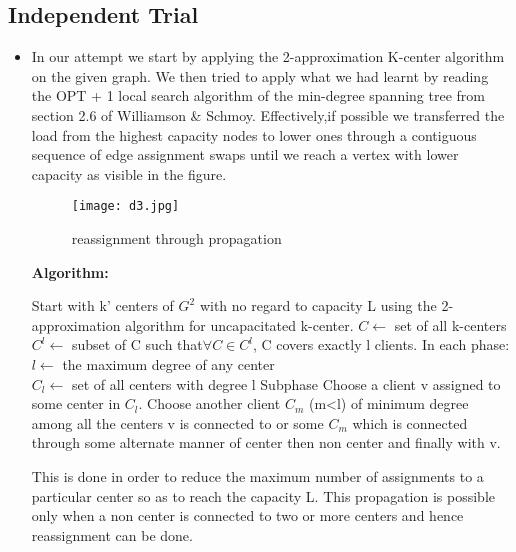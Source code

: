 \documentclass[12pt,a4paper,onecolumn]{article}
\begin{document}
\subsection{Independent Trial}
\begin{itemize}
\item In our attempt we start by applying the 2-approximation K-center algorithm on the given graph. We then tried to apply what we had learnt by reading the OPT + 1 local search algorithm of the min-degree spanning tree from section 2.6 of Williamson \& Schmoy. Effectively,if possible we transferred the load from the highest capacity nodes to lower ones through a contiguous sequence of edge assignment swaps until we reach a vertex with lower capacity as visible in the figure. \\
\begin{figure}[H]
\begin{center}
\texttt{[image: d3.jpg]}
  \caption{reassignment through propagation}
  \label{Figure 13}
\end{center}
\end{figure}
\textbf{Algorithm:}
\begin{algorithmic}[1]
\STATE Start with k' centers of $G^2$ with no regard to capacity L using the 2-approximation algorithm for uncapacitated k-center.
\STATE $C \leftarrow$ set of all k-centers
\STATE $C^l \leftarrow$ subset of C such that$\forall C \in C^l$, C covers exactly l clients.
\STATE In each phase:\\
\STATE \hspace{1cm}$l \leftarrow$ the maximum degree of any center\\
\STATE \hspace{1cm}$C_l \leftarrow$ set of all centers with degree l
\STATE Subphase
\STATE Choose a client v assigned to some center in $C_l$.
\STATE Choose another client $C_m$ (m<l) of minimum degree among all the centers v is connected to or some $C_m$ which is connected through some alternate manner of center then non center and finally with v.
\ENDWHILE
\end{algorithmic}
This is done in order to reduce the maximum number of assignments to a particular center so as to reach the capacity L. This propagation is possible only when a non center is connected to two or more centers and hence reassignment can be done.


\end{itemize}
\end{document}
